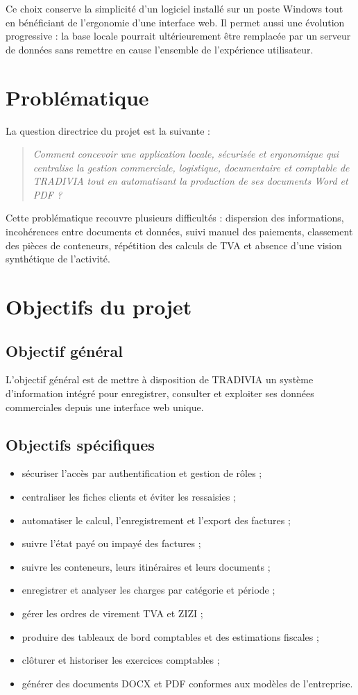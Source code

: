 \documentclass[12pt,a4paper,oneside]{report}
\begin{document}
Ce choix conserve la simplicité d'un logiciel installé sur un poste Windows tout en bénéficiant de l'ergonomie d'une interface web. Il permet aussi une évolution progressive : la base locale pourrait ultérieurement être remplacée par un serveur de données sans remettre en cause l'ensemble de l'expérience utilisateur.

\section{Problématique}
La question directrice du projet est la suivante :

\begin{quote}
\textit{Comment concevoir une application locale, sécurisée et ergonomique qui centralise la gestion commerciale, logistique, documentaire et comptable de TRADIVIA tout en automatisant la production de ses documents Word et PDF ?}
\end{quote}

Cette problématique recouvre plusieurs difficultés : dispersion des informations, incohérences entre documents et données, suivi manuel des paiements, classement des pièces de conteneurs, répétition des calculs de TVA et absence d'une vision synthétique de l'activité.

\section{Objectifs du projet}
\subsection{Objectif général}
L'objectif général est de mettre à disposition de TRADIVIA un système d'information intégré pour enregistrer, consulter et exploiter ses données commerciales depuis une interface web unique.

\subsection{Objectifs spécifiques}
\begin{itemize}
  \item sécuriser l'accès par authentification et gestion de rôles ;
  \item centraliser les fiches clients et éviter les ressaisies ;
  \item automatiser le calcul, l'enregistrement et l'export des factures ;
  \item suivre l'état payé ou impayé des factures ;
  \item suivre les conteneurs, leurs itinéraires et leurs documents ;
  \item enregistrer et analyser les charges par catégorie et période ;
  \item gérer les ordres de virement TVA et ZIZI ;
  \item produire des tableaux de bord comptables et des estimations fiscales ;
  \item clôturer et historiser les exercices comptables ;
  \item générer des documents DOCX et PDF conformes aux modèles de l'entreprise.
\end{itemize}
\end{document}
